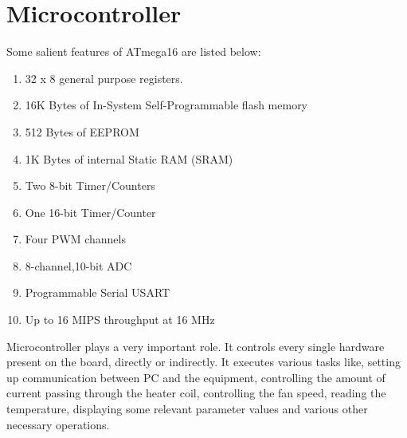 \documentclass[12pt]{report}
\begin{document}
\section{Microcontroller}
Some salient features of ATmega16 are listed below:
\begin{enumerate}
\item 32 x 8 general purpose registers.
\item 16K Bytes of In-System Self-Programmable flash memory
\item 512 Bytes of EEPROM
\item 1K Bytes of internal Static RAM (SRAM)
\item Two 8-bit Timer/Counters
\item One 16-bit Timer/Counter
\item Four PWM channels
\item 8-channel,10-bit ADC
\item Programmable Serial USART
\item Up to 16 MIPS throughput at 16 MHz
\end{enumerate}
Microcontroller plays a very important role. It controls every single hardware present on the board, directly or indirectly. It executes various tasks like, setting up communication between PC and the equipment, controlling the amount of current passing through the heater coil, controlling the fan speed, reading the temperature, displaying some relevant parameter values and various other necessary operations.
\end{document}
